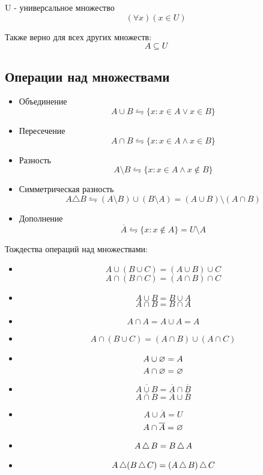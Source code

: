 \begin{definition}
U - универсальное множество \[
	(\forall x)(x \in U)
\]

Также верно для всех других множеств: \[
A \subseteq U
\] 
\end{definition}

\subsection{Операции над множествами}
\begin{itemize}
\item Объединение \[
A \cup B \leftrightharpoons \{x: x \in A \lor x \in B\}
\]
\item Пересечение \[
A \cap B \leftrightharpoons \{x: x \in A \land x \in B\} 
\] 
\item Разность \[
A \setminus B \leftrightharpoons \{x: x \in A \land x \not\in B\} 
\]
\item Симметрическая разность \[
A \triangle B \leftrightharpoons (A\setminus B) \cup (B \setminus A) = (A \cup B) \setminus (A\cap B)
\] 
\item Дополнение \[
\overline{A} \leftrightharpoons \{x:x \not\in A\} = U \setminus A 
\] 
\end{itemize}

\medskip

Тождества операций над множествами:
\begin{itemize}
	\item \[
	A \cup (B \cup C) = (A \cup B) \cup C
	\]
	\[
	A \cap (B \cap C) = (A \cap B) \cap C
	\]
\item \[
A \cup B = B \cup A
\] 
\[
A \cap B = B \cap A
\]
\item \[
A \cap A = A \cup A = A
\] 
\item \[
A \cap (B \cup C) = (A \cap B) \cup (A \cap C)
\]
\item \[
A \cup \varnothing = A
\] 
\[
A \cap \varnothing = \varnothing
\]
\item \[
\overline{A \cup B} = \overline{A} \cap	\overline{B}
\] 
\[
\overline{A \cap B} = \overline{A} \cup \overline{B}
\] 
\item \[
A \cup \overline{A} = U
\] 
\[
A \cap \overline{A} = \varnothing
\] 
\item \[
A\operatorname{\triangle} B = B\operatorname{\triangle} A
\]
\item \[
A\operatorname{\triangle} (B \operatorname{\triangle} C) = (A\operatorname{\triangle} B)\operatorname{\triangle} C
\] 
\end{itemize}

\medskip

